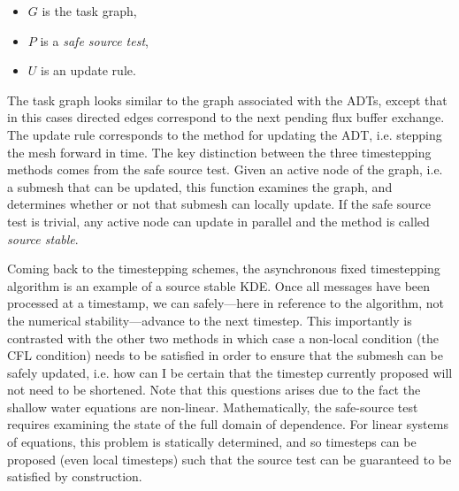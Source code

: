 \begin{itemize}
\item $G$ is the task graph,
\item $P$ is a {\em safe source test},
\item $U$ is an update rule.
\end{itemize}
The task graph looks similar to the graph associated with the ADTs, except that in this cases directed edges correspond to the next pending flux buffer exchange. The update rule corresponds to the method for updating the ADT, i.e. stepping the mesh forward in time. The key distinction between the three timestepping methods comes from the safe source test. Given an active node of the graph, i.e. a submesh that can be updated, this function examines the graph, and determines whether or not that submesh can locally update. If the safe source test is trivial, any active node can update in parallel and the method is called {\em source stable}.

Coming back to the timestepping schemes, the asynchronous fixed timestepping algorithm is an example of a source stable KDE. Once all messages have been processed at a timestamp, we can safely---here in reference to the algorithm, not the numerical stability---advance to the next timestep. This importantly is contrasted with the other two methods in which case a non-local condition (the CFL condition) needs to be satisfied in order to ensure that the submesh can be safely updated, i.e. how can I be certain that the timestep currently proposed will not need to be shortened. Note that this questions arises due to the fact the shallow water equations are non-linear. Mathematically, the safe-source test requires examining the state of the full domain of dependence. For linear systems of equations, this problem is statically determined, and so timesteps can be proposed (even local timesteps) such that the source test can be guaranteed to be satisfied by construction.

